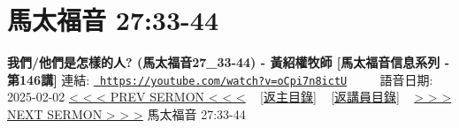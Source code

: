 \documentclass{book}
\begin{document}
\section{馬太福音 27:33-44}
\label{sec:oCpi7n8ictU}
\textbf{我們/他們是怎樣的人? (馬太福音27\_33-44) - 黃紹權牧師  [馬太福音信息系列 - 第146講]}
\newline
\newline
連結: \href{https://youtube.com/watch?v=oCpi7n8ictU}{\texttt{ https://youtube.com/watch?v=oCpi7n8ictU}} ~~~~ 語音日期: 2025-02-02 
\newline
\newline
\hyperref[sec:HaaLhKYBRSg]{< < < PREV SERMON < < <}
~
\hyperlink{toc}{[返主目錄]}
~
\hyperref[ch:preacher10]{[返講員目錄]}
~
\hyperref[sec:7upP8JmD6zY]{> > > NEXT SERMON > > >}
\newline
\newline
馬太福音 27:33-44
\newline
\end{document}
